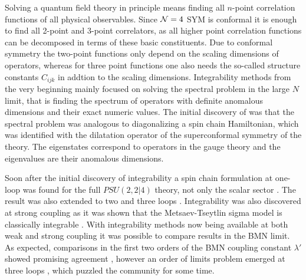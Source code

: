 \vspace{20pt}
\vspace{20pt}

Solving a quantum field theory in principle means finding all $n$-point correlation functions of all physical observables. 
Since $\mathcal{N}=4$ SYM is conformal it is enough to find all 2-point and 3-point correlators, as all higher point correlation functions can be decomposed in terms of these basic constituents.
Due to conformal symmetry the two-point functions only depend on the scaling dimensions of operators, whereas for three point functions one also needs the so-called structure constants $C_{ijk}$ in addtion to the scaling dimensions.
Integrability methods from the very beginning mainly focused on solving the spectral problem in the large $N$ limit, that is finding the spectrum of operators with definite anomalous dimensions and their exact numeric values.
The initial discovery of \cite{Minahan:2002ve} was that the spectral problem was analogous to diagonalizing a spin chain Hamiltonian, which was identified with the dilatation operator of the superconformal symmetry of the theory.
The eigenstates correspond to operators in the gauge theory and the eigenvalues are their anomalous dimensions.

Soon after the initial discovery of integrability a spin chain formulation at one-loop was found for the full $PSU(2,2|4)$ theory, not only the scalar sector \cite{Beisert:2003jj}. 
The result was also extended to two and three loops \cite{Beisert:2003tq}. 
Integrability was also discovered at strong coupling as it was shown that the Metsaev-Tseytlin sigma model is classically integrable \cite{Bena:2003wd}. 
With integrability methods now being available at both weak and strong coupling it was possible to compare results in the BMN limit.
As expected, comparisons in the first two orders of the BMN coupling constant $\lambda'$ showed promising agreement \cite{Frolov:2003qc, Frolov:2003xy, Arutyunov:2003uj}, however an order of limits problem emerged at three loops \cite{Beisert:2003tq}, which puzzled the community for some time. 

